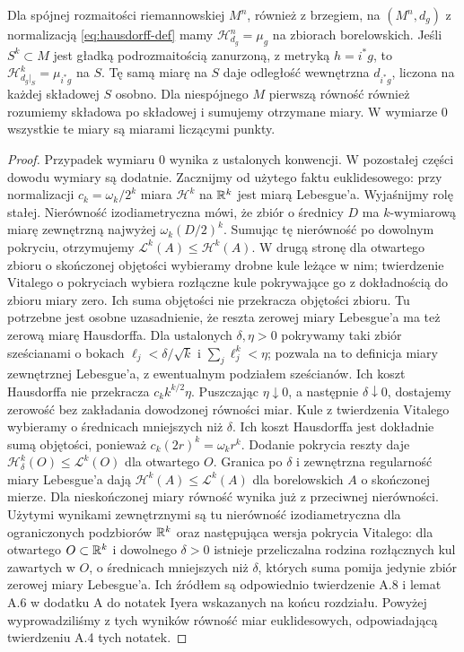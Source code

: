 \begin{twierdzenie}
\label{thm:hausdorff-rownosc}
Dla spójnej rozmaitości riemannowskiej $M^n$, również
z brzegiem, na $(M^n,d_g)$ z normalizacją
\eqref{eq:hausdorff-def} mamy
$\mathcal H^n_{d_g}=\mu_g$
na zbiorach borelowskich.
Jeśli $S^k\subset M$ jest gładką
podrozmaitością zanurzoną, z metryką $h=i^*g$,
to $\mathcal H^k_{d_g|_S}=\mu_{i^*g}$
na $S$. Tę samą miarę na $S$ daje
odległość wewnętrzna $d_{i^*g}$, liczona na każdej
składowej $S$ osobno. Dla niespójnego $M$ pierwszą
równość również rozumiemy składowa po składowej
i sumujemy otrzymane miary. W wymiarze $0$ wszystkie
te miary są miarami liczącymi punkty.
\end{twierdzenie}
\begin{proof}
Przypadek wymiaru $0$ wynika z ustalonych konwencji.
W pozostałej części dowodu wymiary są dodatnie.
Zacznijmy od użytego faktu euklidesowego:
przy normalizacji $c_k=\omega_k/2^k$
miara $\mathcal H^k$ na $\mathbb{R}^k$ jest
miarą Lebesgue'a. Wyjaśnijmy rolę stałej.
Nierówność izodiametryczna mówi, że zbiór
o średnicy $D$ ma $k$-wymiarową miarę
zewnętrzną najwyżej $\omega_k(D/2)^k$.
Sumując tę nierówność po dowolnym
pokryciu, otrzymujemy
$\mathcal L^k(A)\leq\mathcal H^k(A)$.
W drugą stronę dla otwartego zbioru
o skończonej objętości wybieramy drobne
kule leżące w nim; twierdzenie Vitalego
o pokryciach wybiera rozłączne kule
pokrywające go z dokładnością do zbioru
miary zero. Ich suma objętości nie
przekracza objętości zbioru. Tu potrzebne jest
osobne uzasadnienie, że reszta zerowej miary Lebesgue'a
ma też zerową miarę Hausdorffa. Dla ustalonych
$\delta,\eta>0$ pokrywamy taki zbiór sześcianami
o bokach $\ell_j<\delta/\sqrt{k}$ i
$\sum_j\ell_j^k<\eta$; pozwala na to definicja miary
zewnętrznej Lebesgue'a, z ewentualnym podziałem sześcianów.
Ich koszt Hausdorffa nie przekracza
$c_k k^{k/2}\eta$. Puszczając $\eta\downarrow0$,
a następnie $\delta\downarrow0$, dostajemy zerowość
bez zakładania dowodzonej równości miar.
Kule z twierdzenia Vitalego wybieramy o średnicach
mniejszych niż $\delta$. Ich koszt Hausdorffa jest
dokładnie sumą objętości, ponieważ $c_k(2r)^k=\omega_k r^k$.
Dodanie pokrycia reszty daje
$\mathcal H^k_\delta(O)\leq\mathcal L^k(O)$ dla otwartego $O$.
Granica po $\delta$ i zewnętrzna regularność miary
Lebesgue'a dają $\mathcal H^k(A)\leq\mathcal L^k(A)$
dla borelowskich $A$ o skończonej mierze.
Dla nieskończonej miary równość wynika już
z przeciwnej nierówności.
Użytymi wynikami zewnętrznymi są tu nierówność
izodiametryczna dla ograniczonych podzbiorów $\mathbb{R}^k$
oraz następująca wersja pokrycia Vitalego:
dla otwartego $O\subset\mathbb{R}^k$ i dowolnego $\delta>0$
istnieje przeliczalna rodzina rozłącznych kul zawartych
w $O$, o średnicach mniejszych niż $\delta$,
których suma pomija jedynie zbiór zerowej miary Lebesgue'a.
Ich źródłem są odpowiednio twierdzenie A.8 i lemat A.6
w dodatku A do notatek Iyera wskazanych na końcu rozdziału.
Powyżej wyprowadziliśmy z tych wyników równość miar
euklidesowych, odpowiadającą twierdzeniu A.4 tych notatek.


\end{proof}
